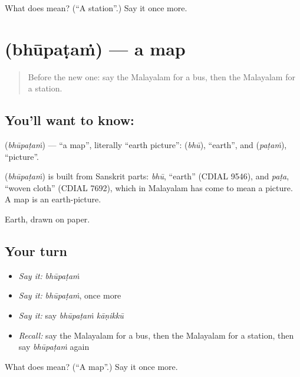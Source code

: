 \begin{tcolorbox}[breakable,colback=teal!4,colframe=teal!35!black,title={Before you move on}]
What does  mean? (\textquotedblleft{}A station\textquotedblright{}.) Say it once more.
\end{tcolorbox}
\section[\texorpdfstring{\ml{ഭൂപടം} (bhūpaṭaṁ)}{ഭൂപടം (bhūpaṭaṁ)}]{ (bhūpaṭaṁ) — a map}

\label{lesson:ML-C121-map}



\begin{quote}
Before the new one: say the Malayalam for a bus, then the Malayalam for a station.
\end{quote}

\subsection*{You'll want to know: }
\textbf{} (\emph{bhūpaṭaṁ}) — \textquotedblleft{}a map\textquotedblright{}, literally \textquotedblleft{}earth picture\textquotedblright{}: \textbf{} (\emph{bhū}), \textquotedblleft{}earth\textquotedblright{}, and \textbf{} (\emph{paṭaṁ}), \textquotedblleft{}picture\textquotedblright{}.

\begin{cousinweb}
\textbf{} (\emph{bhūpaṭaṁ}) is built from Sanskrit parts: \emph{bhū}, \textquotedblleft{}earth\textquotedblright{} (CDIAL 9546), and \emph{paṭa}, \textquotedblleft{}woven cloth\textquotedblright{} (CDIAL 7692), which in Malayalam has come to mean a picture. A map is an earth-picture.
\end{cousinweb}

\begin{grammarlens}[title={What you've built}]
Earth, drawn on paper.
\end{grammarlens}

\subsection*{Your turn}
\begin{itemize}
\raggedright
  \item \emph{Say it:} \emph{bhūpaṭaṁ}
  \item \emph{Say it:} \emph{bhūpaṭaṁ}, once more
  \item \emph{Say it:} say \emph{bhūpaṭaṁ kāṇikkū}
  \item \emph{Recall:} say the Malayalam for a bus, then the Malayalam for a station, then say \emph{bhūpaṭaṁ} again
\end{itemize}

\begin{tcolorbox}[breakable,colback=teal!4,colframe=teal!35!black,title={Before you move on}]
What does  mean? (\textquotedblleft{}A map\textquotedblright{}.) Say it once more.
\end{tcolorbox}
